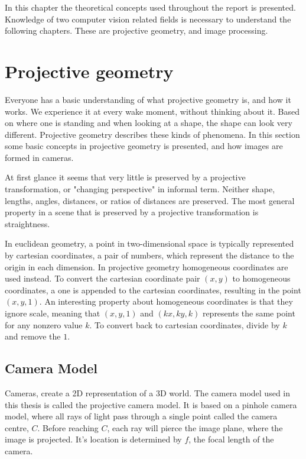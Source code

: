 In this chapter the theoretical concepts used throughout the report is presented. Knowledge of two computer vision related fields is necessary to understand the following chapters. These are projective geometry, and image processing.

\section{Projective geometry}
Everyone has a basic understanding of what projective geometry is, and how it works.
We experience it at every wake moment, without thinking about it. 
Based on where one is standing and when looking at a shape, the shape can look very different. %
Projective geometry describes these kinds of phenomena.
In this section some basic concepts in projective geometry is presented, and how images are formed in cameras.

At first glance it seems that very little is preserved by a projective transformation, or "changing perspective" in informal term.
Neither shape, lengths, angles, distances, or ratios of distances are preserved.
The most general property in a scene that is preserved by a projective transformation is straightness. \cite[1]{hartley-zisserman}

In euclidean geometry, a point in two-dimensional space is typically represented by cartesian coordinates, a pair of numbers, which represent the distance to the origin in each dimension. %
In projective geometry homogeneous coordinates are used instead.
To convert the cartesian coordinate pair $(x,y)$ to homogeneous coordinates, a one is appended to the cartesian coordinates, resulting in the point $(x,y,1)$. 
An interesting property about homogeneous coordinates is that they ignore scale, meaning that $(x,y,1)$ and $(kx,ky,k)$ represents the same point for any nonzero value $k$.
To convert back to cartesian coordinates, divide by $k$ and remove the $1$.\cite[2]{hartley-zisserman} %

\subsection{Camera Model}\label{camera-model}
Cameras, create a 2D representation of a 3D world.
The camera model used in this thesis is called the projective camera model.
It is based on a pinhole camera model, where all rays of light pass through a single point called the camera centre, $C$. Before reaching $C$, each ray will pierce the image plane, where the image is projected.
It's location is determined by $f$, the focal length of the camera.


